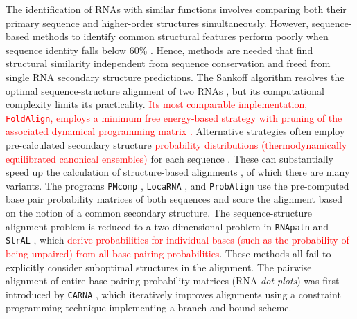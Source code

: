 \documentclass{bmcart}
\newcommand\locarna{\texttt{LocaRNA}}
\newcommand\carna{\texttt{CARNA}}
\begin{document}
The identification of RNAs with similar functions involves comparing both their primary
sequence and higher-order structures simultaneously. However, sequence-based
methods to identify common structural features perform poorly when sequence
identity falls below 60\%  \cite{Gardner15860779}. Hence, methods are needed
that find structural similarity independent from sequence conservation and
freed from single RNA secondary structure predictions. The Sankoff algorithm
resolves the optimal sequence-structure alignment of two RNAs \cite{sankoff85},
but its computational complexity limits its practicality.  \textcolor{red}{Its most comparable
implementation, \texttt{FoldAlign}, employs a minimum free energy-based strategy with pruning of the
associated dynamical programming matrix \cite{Havgaard17937495,Sundfeld26704597}.} 
Alternative strategies often employ pre-calculated secondary structure \textcolor{red}{probability 
distributions (thermodynamically equilibrated canonical ensembles)} for each sequence 
\cite{McCaskill:1990}. These can substantially speed up the calculation of
structure-based alignments \cite{Hofacker15073017}, of which there are many
variants.  The programs \texttt{PMcomp} \cite{Hofacker15073017}, \locarna{}
\cite{Will17432929}, and \texttt{ProbAlign} \cite{Roshan16954142} use the
pre-computed base pair probability matrices of both sequences and score the
alignment based on the notion of a common secondary structure. The
sequence-structure alignment problem is reduced to a two-dimensional problem in
\texttt{RNApaln} \cite{Lorenz22115189} and \texttt{StrAL} \cite{Dalli16613908},
which \textcolor{red}{derive probabilities for individual bases 
(such as the probability of being unpaired) from all base pairing probabilities}. 
These methods all fail to explicitly consider suboptimal structures in the alignment. 
The pairwise alignment of entire base pairing probability matrices (RNA \emph{dot plots}) 
was first introduced by \carna{} \cite{Palu2010,Sorescu2012}, which iteratively 
improves alignments using a constraint programming technique implementing 
a branch and bound scheme. \\ 
\end{document}
